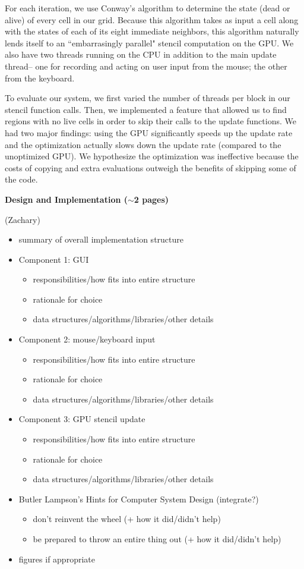 \documentclass[12pt]{article}
\newcommand{\mybegit}{\vspace{-2mm} \begin{itemize} \itemsep-.6em }
\newcommand{\mytitle}[1]{\vspace{10mm} \noindent\begin{large} \textbf{{#1}} \end{large}}
\begin{document}
	For each iteration, we use Conway's algorithm to determine the state (dead or alive) of every cell in our grid. Because this algorithm takes as input a cell along with the states of each of its eight immediate neighbors, this algorithm naturally lends itself to an ``embarrasingly parallel" stencil computation on the GPU. We also have two threads running on the CPU in addition to the main update thread-- one for recording and acting on user input from the mouse; the other from the keyboard. 
	
	To evaluate our system, we first varied the number of threads per block in our stencil function calls. Then, we implemented a feature that allowed us to find regions with no live cells in order to skip their calls to the update functions.
We had two major findings: using the GPU significantly speeds up the update rate and the optimization actually slows down the update rate (compared to the unoptimized GPU). We hypothesize the optimization was ineffective because the costs of copying and extra evaluations outweigh the benefits of skipping some of the code.





\newpage\mytitle{Design and Implementation ($\sim$2 pages)} (Zachary)
\mybegit
	\item summary of overall implementation structure
	\item Component 1: GUI
		\mybegit
			\item responsibilities/how fits into entire structure
			\item rationale for choice 
			\item data structures/algorithms/libraries/other details
		\end{itemize}
	\item Component 2: mouse/keyboard input
		\mybegit
			\item responsibilities/how fits into entire structure
			\item rationale for choice 
			\item data structures/algorithms/libraries/other details
		\end{itemize}
	\item Component 3: GPU stencil update
		\mybegit
			\item responsibilities/how fits into entire structure
			\item rationale for choice 
			\item data structures/algorithms/libraries/other details
		\end{itemize}
	\item Butler Lampson's Hints for Computer System Design (integrate?)
		\mybegit
			\item don't reinvent the wheel (+ how it did/didn't help)
			\item be prepared to throw an entire thing out  (+ how it did/didn't help)
		\end{itemize}
	\item figures if appropriate
\end{itemize}
\end{document}
